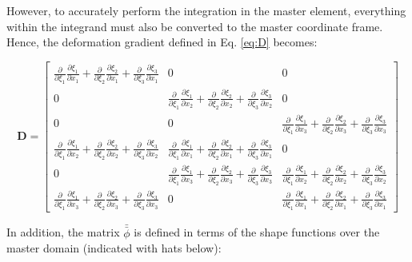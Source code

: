 \documentclass[10pt]{article}
\begin{document}
However, to accurately perform the integration in the master element, everything within the integrand must also be converted to the master coordinate frame. Hence, the deformation gradient defined in Eq. \eqref{eq:D} becomes:

\begin{equation}
\label{eq:D}
\textbf{D}=\begin{bmatrix}\frac{\partial}{\partial\xi_1}\frac{\partial\xi_1}{\partial x_1}+\frac{\partial}{\partial\xi_2}\frac{\partial\xi_2}{\partial x_1}+\frac{\partial}{\partial\xi_3}\frac{\partial\xi_3}{\partial x_1} & 0 & 0\\
0 & \frac{\partial}{\partial\xi_1}\frac{\partial\xi_1}{\partial x_2}+\frac{\partial}{\partial\xi_2}\frac{\partial\xi_2}{\partial x_2}+\frac{\partial}{\partial\xi_3}\frac{\partial\xi_3}{\partial x_2} & 0\\
0 & 0 & \frac{\partial}{\partial\xi_1}\frac{\partial\xi_1}{\partial x_3}+\frac{\partial}{\partial\xi_2}\frac{\partial\xi_2}{\partial x_3}+\frac{\partial}{\partial\xi_3}\frac{\partial\xi_3}{\partial x_3}\\
\frac{\partial}{\partial\xi_1}\frac{\partial\xi_1}{\partial x_2}+\frac{\partial}{\partial\xi_2}\frac{\partial\xi_2}{\partial x_2}+\frac{\partial}{\partial\xi_3}\frac{\partial\xi_3}{\partial x_2} & \frac{\partial}{\partial\xi_1}\frac{\partial\xi_1}{\partial x_1}+\frac{\partial}{\partial\xi_2}\frac{\partial\xi_2}{\partial x_1}+\frac{\partial}{\partial\xi_3}\frac{\partial\xi_3}{\partial x_1} & 0\\
0 & \frac{\partial}{\partial\xi_1}\frac{\partial\xi_1}{\partial x_3}+\frac{\partial}{\partial\xi_2}\frac{\partial\xi_2}{\partial x_3}+\frac{\partial}{\partial\xi_3}\frac{\partial\xi_3}{\partial x_3} & \frac{\partial}{\partial\xi_1}\frac{\partial\xi_1}{\partial x_2}+\frac{\partial}{\partial\xi_2}\frac{\partial\xi_2}{\partial x_2}+\frac{\partial}{\partial\xi_3}\frac{\partial\xi_3}{\partial x_2}\\
\frac{\partial}{\partial\xi_1}\frac{\partial\xi_1}{\partial x_3}+\frac{\partial}{\partial\xi_2}\frac{\partial\xi_2}{\partial x_3}+\frac{\partial}{\partial\xi_3}\frac{\partial\xi_3}{\partial x_3} & 0 & \frac{\partial}{\partial\xi_1}\frac{\partial\xi_1}{\partial x_1}+\frac{\partial}{\partial\xi_2}\frac{\partial\xi_2}{\partial x_1}+\frac{\partial}{\partial\xi_3}\frac{\partial\xi_3}{\partial x_1}\end{bmatrix}
\end{equation}

In addition, the matrix \(\bar{\bar{\phi}}\) is defined in terms of the shape functions over the master domain (indicated with hats below):
\end{document}
